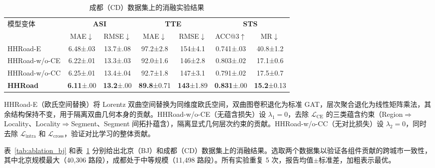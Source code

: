 \begin{table}[H]
    \centering
    \caption{成都（CD）数据集上的消融实验结果}
    \label{tab:ablation_cd}
    \setlength{\tabcolsep}{4pt}
    \renewcommand{\arraystretch}{1.2}
    \begin{tabular}{lcccccc}
        \toprule
        \multirow{2}{*}{模型变体}
            & \multicolumn{2}{c}{\textbf{ASI}}
            & \multicolumn{2}{c}{\textbf{TTE}}
            & \multicolumn{2}{c}{\textbf{STS}} \\
        \cmidrule(lr){2-3} \cmidrule(lr){4-5} \cmidrule(lr){6-7}
            & MAE$\downarrow$ & RMSE$\downarrow$
            & MAE$\downarrow$ & RMSE$\downarrow$
            & ACC@3$\uparrow$ & MR$\downarrow$ \\
        \midrule
        HHRoad-E
            & 6.48\tiny{±.03} & 13.7\tiny{±.08}
            & 97.2\tiny{±2.8} & 154\tiny{±4.1}
            & 0.741\tiny{±.03} & 40.8\tiny{±1.2} \\
        HHRoad-w/o-CE
            & 6.22\tiny{±.01} & 13.3\tiny{±.03}
            & 92.0\tiny{±1.6} & 146\tiny{±2.8}
            & 0.803\tiny{±.02} & 17.1\tiny{±0.6} \\
        HHRoad-w/o-CC
            & 6.25\tiny{±.01} & 13.4\tiny{±.04}
            & 92.7\tiny{±1.8} & 147\tiny{±3.1}
            & 0.791\tiny{±.02} & 17.5\tiny{±0.7} \\
        \textbf{HHRoad}
            & \textbf{6.11}\tiny{±.00} & \textbf{13.2}\tiny{±.00}
            & \textbf{89.8}\tiny{±0.71} & \textbf{143}\tiny{±1.89}
            & \textbf{0.831}\tiny{±.00} & \textbf{15.2}\tiny{±0.13} \\
        \bottomrule
    \end{tabular}
\end{table}

HHRoad-E（欧氏空间替换）将 Lorentz 双曲空间替换为同维度欧氏空间，双曲图卷积退化为标准 GAT，层次聚合退化为线性矩阵乘法，其余结构保持不变，用于隔离双曲几何本身的贡献。HHRoad-w/o-CE（无蕴含损失）设 $\lambda_1=0$，去除 $\mathcal{L}_{\text{CE}}$ 的三类蕴含约束（Region$\Rightarrow$Locality、Locality$\Rightarrow$Segment、Segment 间拓扑蕴含），隔离显式几何层次约束的贡献。HHRoad-w/o-CC（无对比损失）设 $\lambda_2=0$，同时去除 $\mathcal{L}_{\text{intra}}$ 和 $\mathcal{L}_{\text{cross}}$，验证对比学习的整体贡献。

表~\ref{tab:ablation_bj} 和表~\ref{tab:ablation_cd} 分别给出北京（BJ）和成都（CD）数据集上的消融结果。选取两个数据集以验证各组件贡献的跨城市一致性，其中北京规模最大（40,306 路段），成都处于中等规模（11,498 路段）。所有实验重复 5 次，报告均值$\pm$标准差，加粗表示最优。

